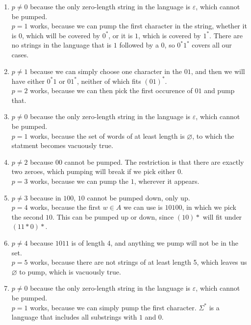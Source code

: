 \documentclass[11pt]{article}
\theoremstyle{definition}
\theoremstyle{case}
\theoremstyle{theorem}
\begin{document}
\begin{enumerate}[label=(\alph*)]

\item
$p \neq 0$ because the only zero-length string in the language is $\varepsilon$, which cannot be pumped. \\
$p = 1$ works, because we can pump the first character in the string, whether it is $0$,
which will be covered by $0^*$, or it is $1$, which is covered by $1^*$. There are no strings in
the language that is $1$ followed by a $0$, so $0^* 1^*$ covers all our cases.

\item
$p \neq 1$ because we can simply choose one character in the $01$, and then we will have either $0^* 1$ or $01^*$, 
neither of which fits $(01)^*$. \\
$p = 2$ works, because we can then pick the first occurence of $01$ and pump that. 

\item
$p \neq 0$ because the only zero-length string in the language is $\varepsilon$, which cannot be pumped. \\
$p = 1$ works, because the set of words of at least length is $\varnothing$, to which the statment becomes
vacuously true.  

\item
$p \neq 2$ because $00$ cannot be pumped. The restriction is that there are exactly two zeroes, which pumping
will break if we pick either $0$. \\
$p = 3$ works, because we can pump the $1$, wherever it appears.

\item
$p \neq 3$ because in $100$, $10$ cannot be pumped down, only up. \\
$p = 4$ works, because the first $w \in A$ we can use is $10100$, in which we pick the second $10$. This
can be pumped up or down, since $(10)*$ will fit under $(11*0)*$. 

\item
$p \neq 4$ because $1011$ is of length 4, and anything we pump will not be in the set. \\
$p = 5$ works, because there are not strings of at least length 5, which leaves us $\varnothing$ to pump,
which is vacuously true.

\item
$p \neq 0$ because the only zero-length string in the language is $\varepsilon$, which cannot be pumped. \\
$p = 1$ works, because we can simply pump the first character. $\Sigma^*$ is a language that includes
all substrings with $1$ and $0$.

\end{enumerate}
\end{document}
